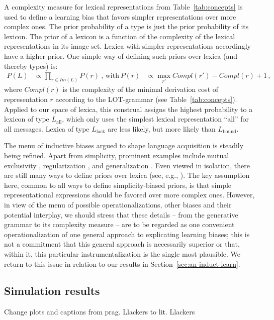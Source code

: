 \documentclass[a4paper, 11pt]{article}
\theoremstyle{Satz}
\newcommand{\hl}[1]{\textcolor[rgb]{.8,.33,.0}{#1}}%
\newcommand{\mylang}[1]{\ensuremath{L_{\text{#1}}}\xspace} %
\newcommand{\Lall}{\mylang{all}}
\newcommand{\Lbound}{\mylang{bound}}
\newcommand{\Llack}{\mylang{lack}}
\begin{document}
A complexity measure for lexical representations from Table~\ref{tab:concepts} is used to define a
learning bias that favors simpler representations over more complex ones. The prior probability of a
type is just the prior probability of its lexicon. The prior of a lexicon is a function of the
complexity of the lexical representations in its image set. Lexica with simpler representations accordingly have a
higher prior. One simple way of defining such priors over lexica (and thereby types) is:
\begin{align*}
  P(L)  & \propto \prod_{r \in Im(L)} P(r)   \ \text{, with} & 
  P(r) & \propto \max_{r'}Compl(r') - Compl(r) + 1\,,
\end{align*}
where $Compl(r)$ is the complexity of the minimal derivation cost of representation $r$ according to the
LOT-grammar (see Table~\ref{tab:concepts}). Applied to our space of lexica, this construal assigns the highest probability 
to a lexicon of type $\Lall$, which only uses the simplest lexical representation ``all'' for
all messages. Lexica of type $\Llack$ are less likely, but more likely than $\Lbound$. 

The menu of inductive biases argued to shape language acquisition is steadily being refined. Apart from simplicity, prominent examples include mutual exclusivity \citep{merriman+bowman:1989,clark:2009}, regularization \citep{hudson+etal:2005}, and generalization \citep{smith:2011}. Even viewed in isolation, there are still many ways to define priors over lexica (see, e.g., \citealt{goodman+etal:2008, piantadosi+etal:2012a, kirby+etal:2015}). The key assumption here, common to all ways to define simplicity-biased priors, is that simple representational expressions should be favored over more complex ones. However, in view of the menu of possible operationalizations, other biases and their potential interplay, we should stress that these details -- from the generative grammar to its complexity measure -- are to be regarded as one convenient operationalization of one general approach to explicating learning biases; this is not a commitment that this general approach is necessarily superior or that, within it, this particular instrumentalization is the single most plausible. We return to this issue in relation to our results in Section~\ref{sec:an-induct-learn}.


\subsection{Simulation results}
\label{sec:simulation-results}
\hl{Change plots and captions from prag. Llackers to lit. Llackers}
\end{document}
